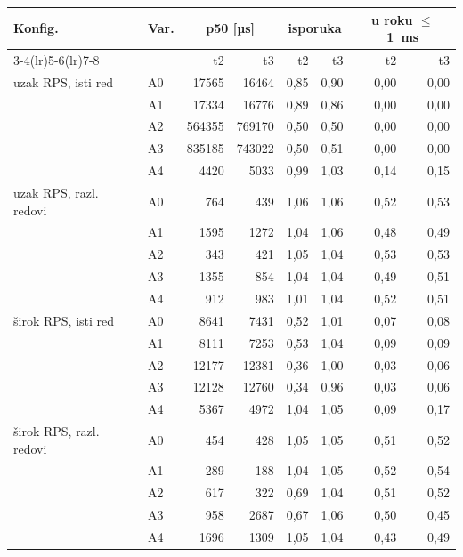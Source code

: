 \begin{tabular}{@{}llrrrrrr@{}}
\toprule
Konfig. & Var. & \multicolumn{2}{c}{p50 [µs]} & \multicolumn{2}{c}{isporuka} & \multicolumn{2}{c}{u roku $\leq$1~ms} \\
\cmidrule(lr){3-4}\cmidrule(lr){5-6}\cmidrule(lr){7-8}
 & & t2 & t3 & t2 & t3 & t2 & t3 \\
\midrule
uzak RPS, isti red & A0 & 17565 & 16464 & 0{,}85 & 0{,}90 & 0{,}00 & 0{,}00 \\
 & A1 & 17334 & 16776 & 0{,}89 & 0{,}86 & 0{,}00 & 0{,}00 \\
 & A2 & 564355 & 769170 & 0{,}50 & 0{,}50 & 0{,}00 & 0{,}00 \\
 & A3 & 835185 & 743022 & 0{,}50 & 0{,}51 & 0{,}00 & 0{,}00 \\
 & A4 & 4420 & 5033 & 0{,}99 & 1{,}03 & 0{,}14 & 0{,}15 \\
\midrule
uzak RPS, razl. redovi & A0 & 764 & 439 & 1{,}06 & 1{,}06 & 0{,}52 & 0{,}53 \\
 & A1 & 1595 & 1272 & 1{,}04 & 1{,}06 & 0{,}48 & 0{,}49 \\
 & A2 & 343 & 421 & 1{,}05 & 1{,}04 & 0{,}53 & 0{,}53 \\
 & A3 & 1355 & 854 & 1{,}04 & 1{,}04 & 0{,}49 & 0{,}51 \\
 & A4 & 912 & 983 & 1{,}01 & 1{,}04 & 0{,}52 & 0{,}51 \\
\midrule
širok RPS, isti red & A0 & 8641 & 7431 & 0{,}52 & 1{,}01 & 0{,}07 & 0{,}08 \\
 & A1 & 8111 & 7253 & 0{,}53 & 1{,}04 & 0{,}09 & 0{,}09 \\
 & A2 & 12177 & 12381 & 0{,}36 & 1{,}00 & 0{,}03 & 0{,}06 \\
 & A3 & 12128 & 12760 & 0{,}34 & 0{,}96 & 0{,}03 & 0{,}06 \\
 & A4 & 5367 & 4972 & 1{,}04 & 1{,}05 & 0{,}09 & 0{,}17 \\
\midrule
širok RPS, razl. redovi & A0 & 454 & 428 & 1{,}05 & 1{,}05 & 0{,}51 & 0{,}52 \\
 & A1 & 289 & 188 & 1{,}04 & 1{,}05 & 0{,}52 & 0{,}54 \\
 & A2 & 617 & 322 & 0{,}69 & 1{,}04 & 0{,}51 & 0{,}52 \\
 & A3 & 958 & 2687 & 0{,}67 & 1{,}06 & 0{,}50 & 0{,}45 \\
 & A4 & 1696 & 1309 & 1{,}05 & 1{,}04 & 0{,}43 & 0{,}49 \\
\bottomrule
\end{tabular}
